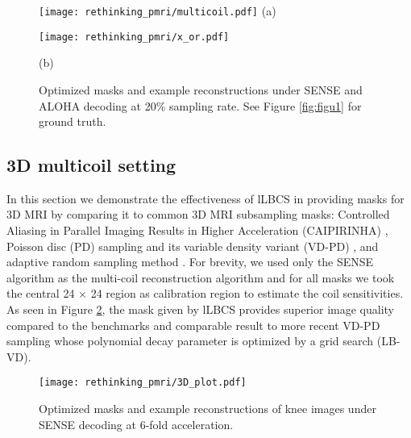     

    \begin{figure}[!ht]
        \begin{minipage}[c]{.6\linewidth}
          \centering
          \texttt{[image: rethinking\_pmri/multicoil.pdf]}
          (a)
        \end{minipage}
        \hfill
        \begin{minipage}[c]{0.3\linewidth}
            \centering
            \texttt{[image: rethinking\_pmri/x\_or.pdf]}

            (b)

            \vspace{\fill}
            \caption{Optimized masks and example reconstructions under SENSE and ALOHA decoding at 20\% sampling rate. See Figure \ref{fig:figu1} for ground truth.} \label{fig:recons}
        \end{minipage}    
    \end{figure}

    \subsection{3D multicoil setting}
    \label{ssec:subhead}

    In this section we demonstrate the effectiveness of lLBCS in providing masks for 3D MRI by comparing it to common 3D MRI subsampling masks: Controlled Aliasing in Parallel Imaging Results in Higher Acceleration (CAIPIRINHA) \citep{breuer2006controlled}, Poisson disc (PD) sampling \citep{bridson2007fast} and its variable density variant (VD-PD) \citep{vasanawala2011practical}, and adaptive random sampling method \citep{knoll2011adapted}. For brevity, we used only  the SENSE algorithm as the multi-coil reconstruction algorithm and for all masks we took the central 24 $\times$ 24 region as calibration region to estimate the coil sensitivities. As seen in Figure \ref{fig:recons_3D}, the mask given by lLBCS provides superior image quality compared to the benchmarks and comparable result to more recent VD-PD sampling whose polynomial decay parameter is optimized by a grid search (LB-VD). 
    
    \begin{figure}[!ht]
        \centering
        \texttt{[image: rethinking\_pmri/3D\_plot.pdf]}    
        \caption{Optimized masks and example reconstructions of knee images under SENSE decoding at 6-fold acceleration. }
        \label{fig:recons_3D}
    \end{figure}


